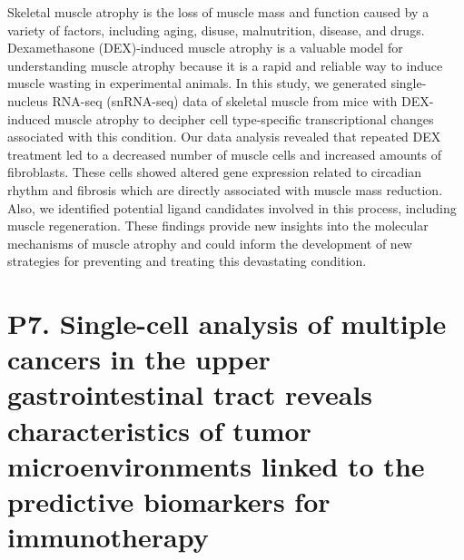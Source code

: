 \noindent
Skeletal muscle atrophy is the loss of muscle mass and function caused by a variety of factors, including aging, disuse, malnutrition, disease, and drugs. Dexamethasone (DEX)-induced muscle atrophy is a valuable model for understanding muscle atrophy because it is a rapid and reliable way to induce muscle wasting in experimental animals. In this study, we generated single-nucleus RNA-seq (snRNA-seq) data of skeletal muscle from mice with DEX-induced muscle atrophy to decipher cell type-specific transcriptional changes associated with this condition. Our data analysis revealed that repeated DEX treatment led to a decreased number of muscle cells and increased amounts of fibroblasts. These cells showed altered gene expression related to circadian rhythm and fibrosis which are directly associated with muscle mass reduction. Also, we identified potential ligand candidates involved in this process, including muscle regeneration. These findings provide new insights into the molecular mechanisms of muscle atrophy and could inform the development of new strategies for preventing and treating this devastating condition.
\newpage

\section*{P7. Single-cell analysis of multiple cancers in the upper gastrointestinal tract reveals characteristics of tumor microenvironments linked to the predictive biomarkers for immunotherapy}

